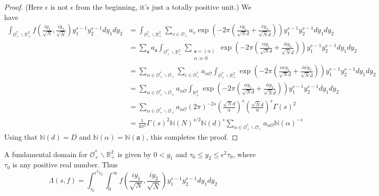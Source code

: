 \documentclass{article}
\theoremstyle{plain}
\begin{document}
\begin{proof}
(Here $\epsilon$ is not $\epsilon$ from the beginning, it's just a totally positive unit.) We have
\begin{align*}
\int_{\mathcal{O}_+^*\backslash \mathbb{R}^2_+} f\left(\frac{iy_1}{\sqrt{N}},\frac{iy_2}{\sqrt{\bar{N}}}\right) y_1^{s-1}y_2^{s-1} dy_1 dy_2 &= \int_{\mathcal{O}_+^*\backslash \mathbb{R}^2_+} \sum_{v \in \mathcal{O}_+} a_v \exp\left( -2\pi \left(\frac{vy_1}{\sqrt{N} d}+\frac{\bar{v} y_2}{\sqrt{\bar{N}}\bar{d}}  \right)\right) y_1^{s-1}y_2^{s-1} dy_1 dy_2\\
&= \sum_{\mathfrak{a}} a_{\mathfrak{a}} \int_{\mathcal{O}_+^*\backslash \mathbb{R}^2_+} \sum_{\substack{\mathfrak{a}=(\alpha)\\ \alpha \gg 0 }} \exp\left( -2\pi \left(\frac{\alpha y_1}{\sqrt{N} d}+\frac{\bar{\alpha} y_2}{\sqrt{\bar{N}}\bar{d}}  \right)\right)  y_1^{s-1}y_2^{s-1} dy_1 dy_2\\
& = \sum_{\alpha \in \mathcal{O}_+^* \backslash \mathcal{O}_+} \sum_{\epsilon \in \mathcal{O}_+^*} a_{\alpha \mathcal{O}} \int_{\mathcal{O}_+^*\backslash \mathbb{R}^2_+} \exp\left( -2\pi \left(\frac{\alpha \epsilon y_1}{\sqrt{N} d}+\frac{\bar{\alpha}\bar{\epsilon} y_2}{\sqrt{\bar{N}}\bar{d}}  \right)\right) y_1^{s-1}y_2^{s-1} dy_1 dy_2\\
& = \sum_{\alpha \in \mathcal{O}_+^* \backslash \mathcal{O}_+} a_{\alpha \mathcal{O}} \int_{\mathbb{R}^2_+} \exp\left( -2\pi \left(\frac{\alpha y_1}{\sqrt{N} d}+\frac{\bar{\alpha} y_2}{\sqrt{\bar{N}}\bar{d}}  \right)\right) y_1^{s-1}y_2^{s-1} dy_1 dy_2\\
&= \sum_{\alpha \in \mathcal{O}_+^* \backslash \mathcal{O}_+} a_{\alpha \mathcal{O}} (2 \pi)^{-2s} \left(\frac{\sqrt{N}d}{\alpha}\right)^s\left(\frac{\sqrt{\bar{N}}\bar{d}}{\bar{\alpha}}\right)^s \Gamma(s)^2\\
&= \frac{1}{4\pi^2} \Gamma(s)^2 \mathbb{N}(N)^{s/2} \mathbb{N}(d)^s \sum_{\alpha \in \mathcal{O}_+^* \backslash \mathcal{O}_+} a_{\alpha \mathcal{O}} \mathbb{N}(\alpha)^{-s}  
\end{align*}
Using that  $\mathbb{N}(d)=D$ and $\mathbb{N}(\alpha)= \mathbb{N}(\mathfrak{a})$, this completes the proof.
\end{proof}

A fundamental domain for $\mathcal{O}_+^*\backslash \mathbb{R}^2_+$ is given by $0<y_1$ and $\tau_0 \leq y_2 \leq \epsilon^2 \tau_0$, where $\tau_0$ is any positive real number. Thus
\begin{equation*}
\Lambda(s,f)= \int_{\tau_0}^{\epsilon^2 \tau_0}\int_{0}^{\infty} f\left(\frac{iy_1}{\sqrt{N}},\frac{iy_2}{\sqrt{\bar{N}}}\right) y_1^{s-1}y_2^{s-1} dy_1 dy_2
\end{equation*}
\end{document}
